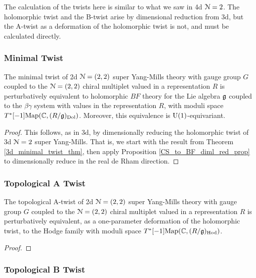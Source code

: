 \documentclass[10pt, oneside]{article}
\begin{document}
The calculation of the twists here is similar to what we saw in 4d $\mathcal{N}=2$.  The holomorphic twist and the B-twist arise by dimensional reduction from 3d, but the A-twist as a deformation of the holomorphic twist is not, and must be calculated directly.

\subsubsection{Minimal Twist} \label{sect:2d22minimaltwist}

\begin{theorem} \label{2d_minimal_twist_thm}
The minimal twist of 2d $\mathcal N=(2,2)$ super Yang-Mills theory with gauge group $G$ coupled to the $\mathcal N=(2,2)$ chiral multiplet valued in a representation $R$ is perturbatively equivalent to holomorphic $BF$ theory for the Lie algebra $\mathfrak g$ coupled to the $\beta\gamma$ system with values in the representation $R$, with moduli space $T^*[-1]\mathrm{Map}(\mathbb C, (R/\mathfrak{g})_{\mathrm{Dol}})$.  Moreover, this equivalence is $\mathrm{U}(1)$-equivariant.
\end{theorem}

\begin{proof}
This follows, as in 3d, by dimensionally reducing the holomorphic twist of 3d $\mathcal{N}=2$ super Yang-Mills.  That is, we start with the result from Theorem \ref{3d_minimal_twist_thm}, then apply Proposition \ref{CS_to_BF_diml_red_prop} to dimensionally reduce in the real de Rham direction.
\end{proof}

\subsubsection{Topological A Twist} \label{sect:2d22Atwist}

\begin{theorem} \label{2d_2_A_twist_thm}
The topological A-twist of 2d $\mathcal{N}=(2,2)$ super Yang-Mills theory with gauge group $G$ coupled to the $\mathcal{N}=(2,2)$ chiral multiplet valued in a representation $R$ is perturbatively equivalent, as a one-parameter deformation of the holomorphic twist, to the Hodge family with moduli space $T^*[-1]\mathrm{Map}(\mathbb C, (R/\mathfrak{g})_{\mathrm{Hod}})$.
\end{theorem}

\begin{proof}
 
\end{proof}

\subsubsection{Topological B Twist} \label{sect:2d22Btwist}
\end{document}
